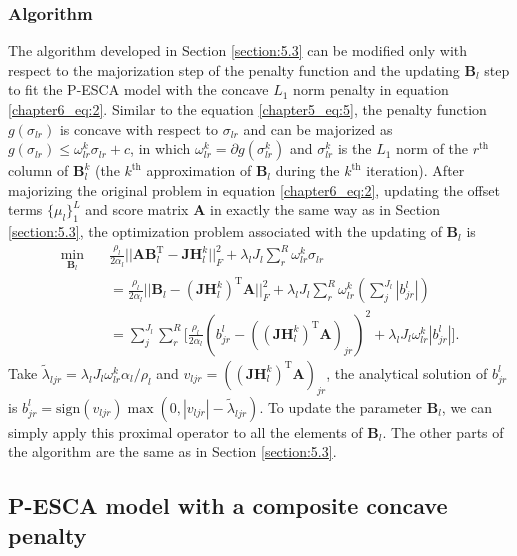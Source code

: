 \subsubsection{Algorithm}
The algorithm developed in Section \ref{section:5.3} can be modified only with respect to the majorization step of the penalty function and the updating $\mathbf{B}_l$ step to fit the P-ESCA model with the concave $L_1$ norm penalty in equation \ref{chapter6_eq:2}. Similar to the equation \ref{chapter5_eq:5}, the penalty function $g(\sigma_{lr})$ is concave with respect to $\sigma_{lr}$ and can be majorized as $g(\sigma_{lr}) \leq \omega_{lr}^k \sigma_{lr} + c$, in which $\omega_{lr}^k = \partial g(\sigma_{lr}^k)$ and $\sigma_{lr}^k$ is the $L_1$ norm of the $r^{\text{th}}$ column of $\mathbf{B}_l^k$ (the $k^{\text{th}}$ approximation of $\mathbf{B}_l$ during the $k^{\text{th}}$ iteration). After majorizing the original problem in equation \ref{chapter6_eq:2}, updating the offset terms $\{\mu_l \}_1^L$ and score matrix $\mathbf{A}$ in exactly the same way as in Section \ref{section:5.3}, the optimization problem associated with the updating of $\mathbf{B}_l$ is
\begin{equation*}
\begin{aligned}
    \min_{\mathbf{B}_l} \quad & \frac{\rho_l}{2\alpha_l} ||\mathbf{AB}_l^{\text{T}} - \mathbf{JH}_{l}^{k}||_F^2  + \lambda_l J_l \sum_{r}^{R} \omega_{lr}^k \sigma_{lr} \\
	&= \frac{\rho_l}{2\alpha_l}||\mathbf{B}_l - (\mathbf{JH}_{l}^{k})^{\text{T}} \mathbf{A}||_F^2 + \lambda_l J_l \sum_{r}^{R} \omega_{lr}^k (\sum_{j}^{J_l} |b_{jr}^l|)\\
    &= \sum_{j}^{J_l} \sum_{r}^R \Big[ \frac{\rho_l}{2\alpha_l}(b_{jr}^l - ((\mathbf{JH}_{l}^{k})^{\text{T}} \mathbf{A})_{jr})^2 + \lambda_l J_l \omega_{lr}^k |b_{jr}^l| \Big].
\end{aligned}
\end{equation*}
Take $\tilde{\lambda}_{ljr} = \lambda_l J_l \omega_{lr}^k \alpha_l/\rho_l$ and $v_{ljr} = ((\mathbf{JH}_{l}^{k})^{\text{T}} \mathbf{A})_{jr}$, the analytical solution of $b_{jr}^{l}$ is $b_{jr}^{l} = \text{sign}(v_{ljr}) \max(0, |v_{ljr}| -\tilde{\lambda}_{ljr})$. To update the parameter $\mathbf{B}_l$, we can simply apply this proximal operator to all the elements of $\mathbf{B}_l$. The other parts of the algorithm are the same as in Section \ref{section:5.3}.

\subsection{P-ESCA model with a composite concave penalty}
